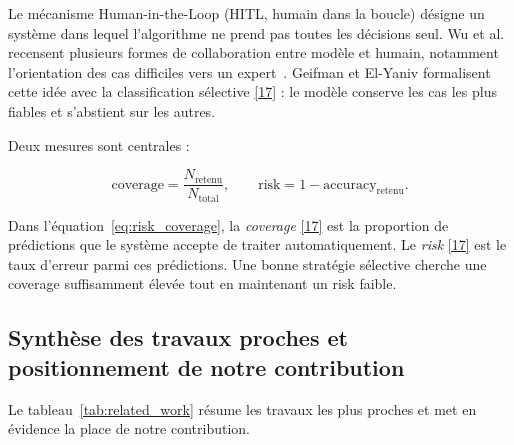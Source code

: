 \documentclass[12pt,a4paper]{article}
\newcommand{\openaccessref}[2]{%
  \nobreak\hspace{0.08em}%
  \href{#2}{\textcolor{green!35!black}{[#1]}}%
}
\begin{document}
Le mécanisme Human-in-the-Loop (HITL, humain dans la boucle) désigne un
système dans lequel l'algorithme ne prend pas toutes les décisions seul. Wu
et al. recensent plusieurs formes de collaboration entre modèle et humain,
notamment l'orientation des cas difficiles vers un expert~\cite{wu2021}.
Geifman et El-Yaniv formalisent cette idée avec la classification sélective\openaccessref{17}{https://arxiv.org/abs/1705.08500} :
le modèle conserve les cas les plus fiables et s'abstient sur les autres.

Deux mesures sont centrales :

\begin{equation}
\text{coverage}
=
\frac{N_{\mathrm{retenu}}}{N_{\mathrm{total}}},
\qquad
\text{risk}
=
1-\text{accuracy}_{\mathrm{retenu}}.
\label{eq:risk_coverage}
\end{equation}

Dans l'équation~\ref{eq:risk_coverage}, la \emph{coverage}\openaccessref{17}{https://arxiv.org/abs/1705.08500} est la proportion
de prédictions que le système accepte de traiter automatiquement. Le
\emph{risk}\openaccessref{17}{https://arxiv.org/abs/1705.08500} est le taux d'erreur parmi ces prédictions. Une bonne stratégie
sélective cherche une coverage suffisamment élevée tout en maintenant un risk
faible.

\subsection{Synthèse des travaux proches et positionnement de notre contribution}

Le tableau~\ref{tab:related_work} résume les travaux les plus proches et met en
évidence la place de notre contribution.
\end{document}
